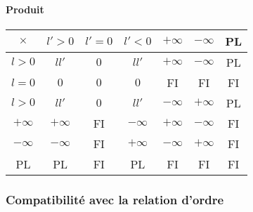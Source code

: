 \paragraph{Produit}
\begin{center}
  \begin{tabular}{|c|c|c|c|c|c|c|}\hline
    $\times$ & $l'>0$ & $l'=0$ & $l'<0$ & $+\infty$ & $-\infty$ & PL \\ \hline
    $l>0$ & $ll'$ & $0$ & $ll'$ & $+\infty$ & $-\infty$ & PL \\ \hline
    $l=0$ & $0$ & $0$ & $0$ & FI & FI & FI \\ \hline
    $l>0$ & $ll'$ & $0$ & $ll'$ & $-\infty$ & $+\infty$ & PL \\ \hline
    $+\infty$ & $+\infty$ & FI & $-\infty$ & $+\infty$ & $-\infty$ & FI \\ \hline
    $-\infty$ & $-\infty$ & FI & $+\infty$ & $-\infty$ & $+\infty$ & FI \\ \hline
    PL & PL & FI & PL & FI & FI & FI \\ \hline
  \end{tabular}
\end{center}

\subsubsection{Compatibilité avec la relation d'ordre}

